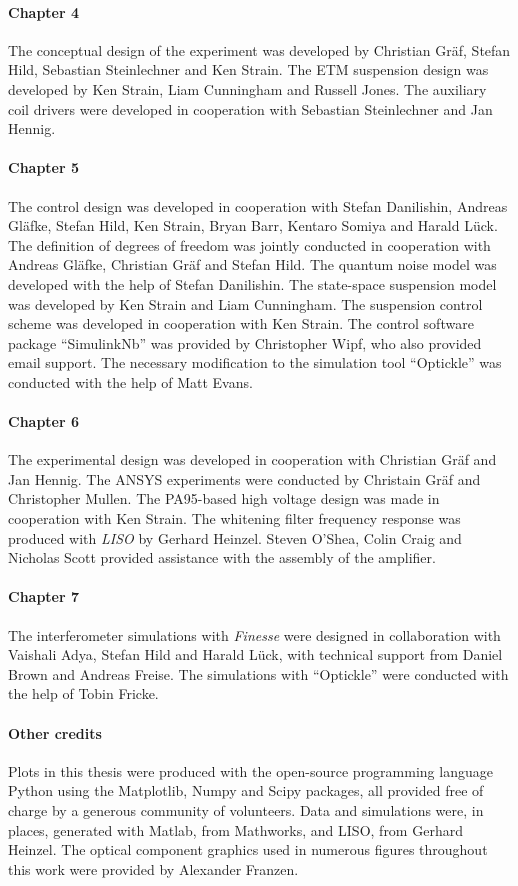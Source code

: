 \paragraph{Chapter 4}
The conceptual design of the experiment was developed by Christian Gr\"{a}f, Stefan Hild, Sebastian Steinlechner and Ken Strain. The ETM suspension design was developed by Ken Strain, Liam Cunningham and Russell Jones. The auxiliary coil drivers were developed in cooperation with Sebastian Steinlechner and Jan Hennig.

\paragraph{Chapter 5}
The control design was developed in cooperation with Stefan Danilishin, Andreas Gl\"{a}fke, Stefan Hild, Ken Strain, Bryan Barr, Kentaro Somiya and Harald L\"{u}ck. The definition of degrees of freedom was jointly conducted in cooperation with Andreas Gl\"{a}fke, Christian Gr\"{a}f and Stefan Hild. The quantum noise model was developed with the help of Stefan Danilishin. The state-space suspension model was developed by Ken Strain and Liam Cunningham. The suspension control scheme was developed in cooperation with Ken Strain. The control software package ``SimulinkNb'' was provided by Christopher Wipf, who also provided email support. The necessary modification to the simulation tool ``Optickle'' was conducted with the help of Matt Evans.

\paragraph{Chapter 6}
The experimental design was developed in cooperation with Christian Gr\"{a}f and Jan Hennig. The ANSYS experiments were conducted by Christain Gr\"{a}f and Christopher Mullen. The PA95-based high voltage design was made in cooperation with Ken Strain. The whitening filter frequency response was produced with \emph{LISO} by Gerhard Heinzel. Steven O'Shea, Colin Craig and Nicholas Scott provided assistance with the assembly of the amplifier.

\paragraph{Chapter 7}
The interferometer simulations with \emph{Finesse} were designed in collaboration with Vaishali Adya, Stefan Hild and Harald L\"{u}ck, with technical support from Daniel Brown and Andreas Freise. The simulations with ``Optickle'' were conducted with the help of Tobin Fricke.

\paragraph{Other credits}
Plots in this thesis were produced with the open-source programming language Python using the Matplotlib, Numpy and Scipy packages, all provided free of charge by a generous community of volunteers. Data and simulations were, in places, generated with Matlab, from Mathworks, and LISO, from Gerhard Heinzel. The optical component graphics used in numerous figures throughout this work were provided by Alexander Franzen.